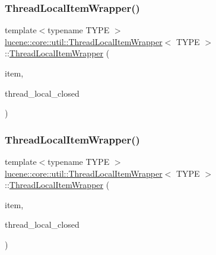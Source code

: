 \subsubsection{\texorpdfstring{Thread\+Local\+Item\+Wrapper()}{ThreadLocalItemWrapper()}\hspace{0.1cm}{\footnotesize\ttfamily [2/3]}}
{\footnotesize\ttfamily template$<$typename T\+Y\+PE $>$ \\
\mbox{\hyperlink{classlucene_1_1core_1_1util_1_1ThreadLocalItemWrapper}{lucene\+::core\+::util\+::\+Thread\+Local\+Item\+Wrapper}}$<$ T\+Y\+PE $>$\+::\mbox{\hyperlink{classlucene_1_1core_1_1util_1_1ThreadLocalItemWrapper}{Thread\+Local\+Item\+Wrapper}} (\begin{DoxyParamCaption}\item[{const T\+Y\+PE \&}]{item,  }\item[{bool $\ast$}]{thread\+\_\+local\+\_\+closed }\end{DoxyParamCaption})\hspace{0.3cm}{\ttfamily [inline]}}

\mbox{\label{classlucene_1_1core_1_1util_1_1ThreadLocalItemWrapper_af5f7a927aa01a94971cb9a358488d551}} 
\subsubsection{\texorpdfstring{Thread\+Local\+Item\+Wrapper()}{ThreadLocalItemWrapper()}\hspace{0.1cm}{\footnotesize\ttfamily [3/3]}}
{\footnotesize\ttfamily template$<$typename T\+Y\+PE $>$ \\
\mbox{\hyperlink{classlucene_1_1core_1_1util_1_1ThreadLocalItemWrapper}{lucene\+::core\+::util\+::\+Thread\+Local\+Item\+Wrapper}}$<$ T\+Y\+PE $>$\+::\mbox{\hyperlink{classlucene_1_1core_1_1util_1_1ThreadLocalItemWrapper}{Thread\+Local\+Item\+Wrapper}} (\begin{DoxyParamCaption}\item[{T\+Y\+PE \&\&}]{item,  }\item[{bool $\ast$}]{thread\+\_\+local\+\_\+closed }\end{DoxyParamCaption})\hspace{0.3cm}{\ttfamily [inline]}}



